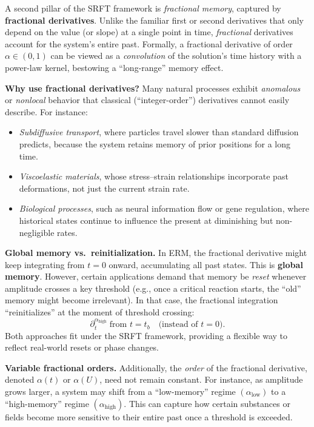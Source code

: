\documentclass[12pt]{article}
\begin{document}
A second pillar of the SRFT framework is \emph{fractional memory}, captured by
\textbf{fractional derivatives}. Unlike the familiar first or second derivatives
that only depend on the value (or slope) at a single point in time, \emph{fractional}
derivatives account for the system’s entire past. Formally, a fractional derivative
of order $\alpha \in (0,1)$ can be viewed as a \emph{convolution} of the solution’s
time history with a power-law kernel, bestowing a “long-range” memory effect.

\medskip

\noindent
\textbf{Why use fractional derivatives?}
Many natural processes exhibit \emph{anomalous} or \emph{nonlocal} behavior that
classical (“integer-order”) derivatives cannot easily describe. For instance:
\begin{itemize}
    \item \emph{Subdiffusive transport}, where particles travel slower than
          standard diffusion predicts, because the system retains memory of
          prior positions for a long time.
    \item \emph{Viscoelastic materials}, whose stress–strain relationships
          incorporate past deformations, not just the current strain rate.
    \item \emph{Biological processes}, such as neural information flow or
          gene regulation, where historical states continue to influence
          the present at diminishing but non-negligible rates.
\end{itemize}

\medskip

\noindent
\textbf{Global memory vs.\ reinitialization.}
In ERM, the fractional derivative might keep integrating from $t=0$ onward,
accumulating all past states. This is \textbf{global memory}. However, certain
applications demand that memory be \emph{reset} whenever amplitude crosses a
key threshold (e.g., once a critical reaction starts, the “old” memory might
become irrelevant). In that case, the fractional integration “reinitializes”
at the moment of threshold crossing:
\[
  \partial_t^{\alpha_{\mathrm{high}}} \; \text{from } t = t_b \quad
  \text{(instead of } t=0).
\]
Both approaches fit under the SRFT framework, providing a flexible way to reflect
real-world resets or phase changes.

\medskip

\noindent
\textbf{Variable fractional orders.}
Additionally, the \emph{order} of the fractional derivative, denoted $\alpha(t)$
or $\alpha(U)$, need not remain constant. For instance, as amplitude grows larger,
a system may shift from a “low-memory” regime $(\alpha_{\mathrm{low}})$ to a
“high-memory” regime $(\alpha_{\mathrm{high}})$. This can capture how certain
substances or fields become more sensitive to their entire past once a threshold
is exceeded.
\end{document}
